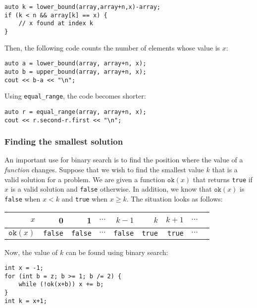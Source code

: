 \begin{lstlisting}
auto k = lower_bound(array,array+n,x)-array;
if (k < n && array[k] == x) {
    // x found at index k
}
\end{lstlisting}

Then, the following code counts the number of elements
whose value is $x$:

\begin{lstlisting}
auto a = lower_bound(array, array+n, x);
auto b = upper_bound(array, array+n, x);
cout << b-a << "\n";
\end{lstlisting}

Using \texttt{equal\_range}, the code becomes shorter:

\begin{lstlisting}
auto r = equal_range(array, array+n, x);
cout << r.second-r.first << "\n";
\end{lstlisting}

\subsubsection{Finding the smallest solution}

An important use for binary search is
to find the position where the value of a \emph{function} changes.
Suppose that we wish to find the smallest value $k$
that is a valid solution for a problem.
We are given a function $\texttt{ok}(x)$
that returns \texttt{true} if $x$ is a valid solution
and \texttt{false} otherwise.
In addition, we know that $\texttt{ok}(x)$ is \texttt{false}
when $x<k$ and \texttt{true} when $x \ge k$.
The situation looks as follows:

\begin{center}
\begin{tabular}{r|rrrrrrrr}
$x$ & 0 & 1 & $\cdots$ & $k-1$ & $k$ & $k+1$ & $\cdots$ \\
\hline
$\texttt{ok}(x)$ & \texttt{false} & \texttt{false}
& $\cdots$ & \texttt{false} & \texttt{true} & \texttt{true} & $\cdots$ \\
\end{tabular}
\end{center}

\noindent
Now, the value of $k$ can be found using binary search:

\begin{lstlisting}
int x = -1;
for (int b = z; b >= 1; b /= 2) {
    while (!ok(x+b)) x += b;
}
int k = x+1;
\end{lstlisting}

